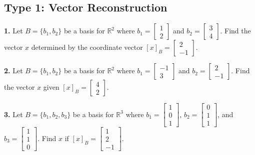 \documentclass{article}
\begin{document}
\subsection*{Type 1: Vector Reconstruction}
\textbf{1.} Let $B = \{b_1, b_2\}$ be a basis for $\mathbb{R}^2$ where $b_1 = \begin{bmatrix} 1 \\ 2 \end{bmatrix}$ and $b_2 = \begin{bmatrix} 3 \\ 4 \end{bmatrix}$. Find the vector $x$ determined by the coordinate vector $[x]_B = \begin{bmatrix} 2 \\ -1 \end{bmatrix}$.

\vspace{0.2cm}
\textbf{2.} Let $B = \{b_1, b_2\}$ be a basis for $\mathbb{R}^2$ where $b_1 = \begin{bmatrix} -1 \\ 3 \end{bmatrix}$ and $b_2 = \begin{bmatrix} 2 \\ -1 \end{bmatrix}$. Find the vector $x$ given $[x]_B = \begin{bmatrix} 4 \\ 2 \end{bmatrix}$.

\vspace{0.2cm}
\textbf{3.} Let $B = \{b_1, b_2, b_3\}$ be a basis for $\mathbb{R}^3$ where $b_1 = \begin{bmatrix} 1 \\ 0 \\ 1 \end{bmatrix}$, $b_2 = \begin{bmatrix} 0 \\ 1 \\ 1 \end{bmatrix}$, and $b_3 = \begin{bmatrix} 1 \\ 1 \\ 0 \end{bmatrix}$. Find $x$ if $[x]_B = \begin{bmatrix} 1 \\ 2 \\ -1 \end{bmatrix}$.
\end{document}
